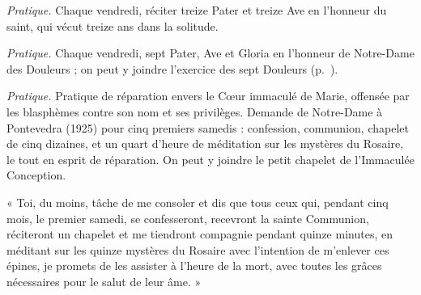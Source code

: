 \documentclass{bibliotheca-missel}
\begin{document}
\begin{notice}\textit{Pratique.} Chaque vendredi, réciter treize Pater et treize Ave en l’honneur du saint, qui vécut treize ans dans la solitude.\end{notice}

\begin{notice}\textit{Pratique.} Chaque vendredi, sept Pater, Ave et Gloria en l’honneur de Notre-Dame des Douleurs ; on peut y joindre l’exercice des sept Douleurs (p.~\pageref{douleurs}).\end{notice}
\culdelampe


\begin{notice}\textit{Pratique.} Pratique de réparation envers le Cœur immaculé de Marie, offensée par les blasphèmes contre son nom et ses privilèges. Demande de Notre-Dame à Pontevedra (1925) pour cinq premiers samedis : confession, communion, chapelet de cinq dizaines, et un quart d’heure de méditation sur les mystères du Rosaire, le tout en esprit de réparation. On peut y joindre le petit chapelet de l’Immaculée Conception.\end{notice}
\begin{notice}
« Toi, du moins, tâche de me consoler et dis que tous ceux qui, pendant cinq mois, le premier samedi, se confesseront, recevront la sainte Communion, réciteront un chapelet et me tiendront compagnie pendant quinze minutes, en méditant sur les quinze mystères du Rosaire avec l’intention de m’enlever ces épines, je promets de les assister à l’heure de la mort, avec toutes les grâces nécessaires pour le salut de leur âme. »
\end{notice}
\end{document}
